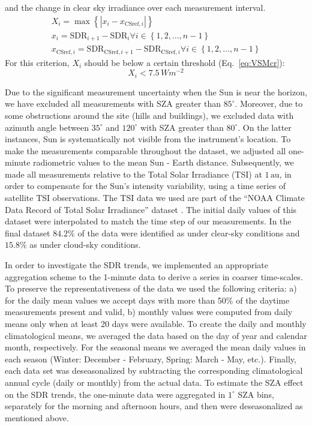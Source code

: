 \documentclass[applsci,article,submit,moreauthors,pdftex]{Definitions/mdpi}
\begin{document}
\begin{enumerate}
  and the change in clear sky irradiance over each measurement interval.
  \begin{gather}
    X_i = \max{\left \{ \left | x_i - x_{\text{CSref},i} \right | \right \}} \label{eq:VSM3} \\
    x_i = \text{SDR}_{i+1} - \text{SDR}_{i} \forall i \in \left \{ 1, 2, \ldots, n-1 \right \} \label{eq:VSM1} \\
    x_{\text{CSref},i} = \text{SDR}_{\text{CSref},i+1} - \text{SDR}_{\text{CSref},i} \forall i \in \left \{ 1, 2, \ldots, n-1 \right \} \label{eq:VSM2}
  \end{gather} For this criterion, \(X_i\) should be below a certain
  threshold (Eq.~\ref{eq:VSMcr}): \begin{equation}
    X_i < 7.5\,Wm^{-2} \label{eq:VSMcr}
  \end{equation}
\end{enumerate}

Due to the significant measurement uncertainty when the Sun is near the
horizon, we have excluded all measurements with SZA greater than
\(85^\circ\). Moreover, due to some obstructions around the site (hills
and buildings), we excluded data with azimuth angle between \(35^\circ\)
and \(120^\circ\) with SZA greater than \(80^\circ\). On the latter
instances, Sun is systematically not visible from the instrument's
location. To make the measurements comparable throughout the dataset, we
adjusted all one-minute radiometric values to the mean Sun - Earth
distance. Subsequently, we made all measurements relative to the Total
Solar Irradiance (TSI) at \(1\,\text{au}\), in order to compensate for
the Sun's intensity variability, using a time series of satellite TSI
observations. The TSI data we used are part of the ``NOAA Climate Data
Record of Total Solar Irradiance'' dataset \citep{Coddington2005}. The
initial daily values of this dataset were interpolated to match the time
step of our measurements. In the final dataset \(84.2\%\) of the data
were identified as under clear-sky conditions and \(15.8\%\) as under
cloud-sky conditions.

In order to investigate the SDR trends, we implemented an appropriate
aggregation scheme to the 1-minute data to derive a series in coarser
time-scales. To preserve the representativeness of the data we used the
following criteria: a) for the daily mean values we accept days with
more than 50\% of the daytime measurements present and valid, b) monthly
values were computed from daily means only when at least 20 days were
available. To create the daily and monthly climatological means, we
averaged the data based on the day of year and calendar month,
respectively. For the seasonal means we averaged the mean daily values
in each season (Winter: December - February, Spring: March - May, etc.).
Finally, each data set was deseasonalized by subtracting the
corresponding climatological annual cycle (daily or monthly) from the
actual data. To estimate the SZA effect on the SDR trends, the
one-minute data were aggregated in \(1^\circ\) SZA bins, separately for
the morning and afternoon hours, and then were deseasonalized as
mentioned above.
\end{document}
